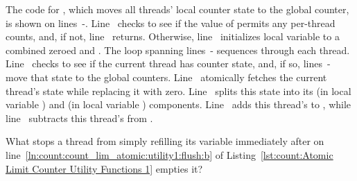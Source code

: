 \begin{lineref}
The code for , which moves all threads' local
counter state to the global counter, is shown on
lines~-.
Line~ checks to see if the value of
 permits
any per-thread counts, and, if not, line~ returns.
Otherwise, line~ initializes local variable  to a combined
zeroed  and .
The loop spanning lines~- sequences
through each thread.
Line~ checks to see if the current thread has counter state,
and, if so, lines~- move that state
to the global counters.
Line~ atomically fetches the current thread's state
while replacing it with zero.
Line~ splits this state into its 
(in local variable )
and  (in local variable ) components.
Line~ adds this thread's  to , while
line~ subtracts this thread's  from .
\end{lineref}

\QuickQuiz{}
	What stops a thread from simply refilling its
	 variable immediately after
	 on
        line~\ref{ln:count:count_lim_atomic:utility1:flush:b} of
	Listing~\ref{lst:count:Atomic Limit Counter Utility Functions 1}
	empties it?
 \QuickQuizEnd


